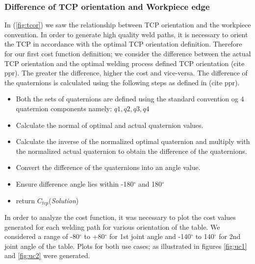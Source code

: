 \subsubsection{Difference of TCP orientation and Workpiece edge}
\label{sssec:tcpcst}
In (\ref{fig:tcor}) we saw the relationship between TCP orientation and the workpiece convention. In order to generate high quality weld paths, it is necessary to orient the TCP in accordance with the optimal TCP orientation definition. Therefore for our first cost function definition; we consider the difference between the actual TCP orientation and the optimal welding process defined TCP orientation (cite ppr). The greater the difference, higher the cost and vice-versa. The difference of the quaternions is calculated using the following steps as defined in (cite ppr).
\begin{itemize}
	\label{algo4ppr}
	\item Both the sets of quaternions are defined using the standard convention og 4 quaternion components namely: $q1,q2,q3,q4$
	\item Calculate the normal of optimal and actual quaternion values.
	\item Calculate the inverse of the normalized optimal quaternion and multiply with the normalized actual quaternion to obtain the difference of the quaternions.
	\item Convert the difference of the quaternions into an angle value.
	\item Ensure difference angle lies within -180$^{\circ}$ and 180$^{\circ}$
	\item return $C_{tcp}$(\textit{Solution})
\end{itemize}
In order to analyze the cost function, it was necessary to plot the cost values generated for each welding path for various orientation of the table. We considered a range of -80$^{\circ}$ to +80$^{\circ}$ for 1st joint angle and -140$^{\circ}$ to 140$^{\circ}$ for 2nd joint angle of the table. Plots for both use cases; as illustrated in figures \ref{fig:uc1} and \ref{fig:uc2}
were generated.
